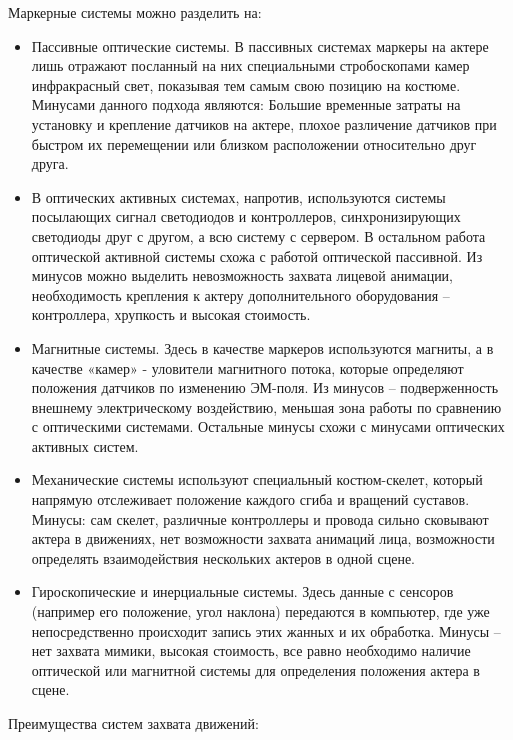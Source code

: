 Маркерные системы можно разделить на:
\begin{itemize}
	\item Пассивные оптические системы. В пассивных системах маркеры на актере лишь отражают посланный на них специальными стробоскопами камер инфракрасный свет, показывая тем самым свою позицию на костюме. Минусами данного подхода являются: Большие временные затраты на установку и крепление датчиков на актере, плохое различение датчиков при быстром их перемещении или близком расположении относительно друг друга.
	\item В оптических активных системах, напротив, используются системы посылающих сигнал светодиодов и контроллеров, синхронизирующих светодиоды друг с другом, а всю систему с сервером. В остальном работа оптической активной системы схожа с работой оптической пассивной. Из минусов можно выделить невозможность захвата лицевой анимации, необходимость крепления к актеру дополнительного оборудования – контроллера, хрупкость и высокая стоимость.
	\item Магнитные системы. Здесь в качестве маркеров используются магниты, а в качестве «камер» - уловители магнитного потока, которые определяют положения датчиков по изменению ЭМ-поля. Из минусов – подверженность внешнему электрическому воздействию, меньшая зона работы по сравнению с оптическими системами. Остальные минусы схожи с минусами оптических активных систем.
	\item Механические системы используют специальный костюм-скелет, который напрямую отслеживает положение каждого сгиба и вращений суставов. Минусы: сам скелет, различные контроллеры и провода сильно сковывают актера в движениях, нет возможности захвата анимаций лица, возможности определять взаимодействия нескольких актеров в одной сцене.
	\item Гироскопические и инерциальные системы. Здесь данные с сенсоров (например его положение, угол наклона) передаются в компьютер, где уже непосредственно происходит запись этих жанных и их обработка. Минусы – нет захвата мимики, высокая стоимость, все равно необходимо наличие оптической или магнитной системы для определения положения актера в сцене.
\end{itemize}
\newline
\newline
Преимущества систем захвата движений:

